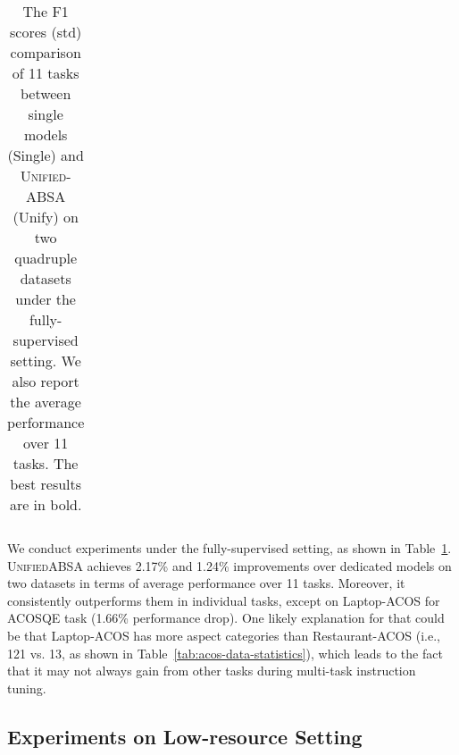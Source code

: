 \documentclass[11pt]{article}
\newcommand{\UnifiedABSA}{\textsc{UnifiedABSA}\xspace}
\begin{document}
\begin{table}[]
{\begin{tabular}{l|cc|cc}
 \bottomrule
\end{tabular}}
\caption{The F1 scores (std) comparison of 11 tasks between single models (Single) and \textsc{Unified-ABSA} (Unify) on two quadruple datasets under the fully-supervised setting. We also report the average performance over 11 tasks. The best results are in bold.}
\vspace{-4mm}
\label{tab:full-data-table}
\end{table} 
We conduct experiments under the fully-supervised setting, as shown in  Table~\ref{tab:full-data-table}. \UnifiedABSA achieves 2.17\% and 1.24\% improvements over dedicated models on two datasets in terms of average performance over 11 tasks. Moreover, it consistently outperforms them in individual tasks, except on Laptop-ACOS for ACOSQE task (1.66\% performance drop). One likely explanation for that could be that Laptop-ACOS has more aspect categories than Restaurant-ACOS (i.e., 121 vs. 13, as shown in Table~\ref{tab:acos-data-statistics}), which leads to the fact that it may not always gain from other tasks during multi-task instruction tuning.



\subsection{Experiments on Low-resource Setting}
\label{sec:low-resource-exp}
\end{document}
